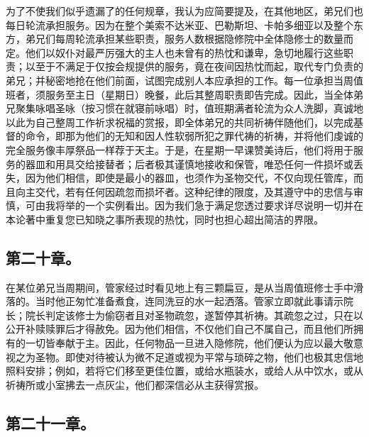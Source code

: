 为了不使我们似乎遗漏了的任何规章，我认为应简要提及，在其他地区，弟兄们也每日轮流承担服务。因为在整个美索不达米亚、巴勒斯坦、卡帕多细亚以及整个东方，弟兄们每周轮流承担某些职责，服务人数根据隐修院中全体隐修士的数量而定。他们以奴仆对最严厉强大的主人也未曾有的热忱和谦卑，急切地履行这些职责；以至于不满足于仅按会规提供的服务，竟在夜间因热忱而起，取代专门负责的弟兄；并秘密地抢在他们前面，试图完成别人本应承担的工作。每一位承担当周值班者，须服务至主日（星期日）晚餐，此后其整周职责即告完成。因此，当全体弟兄聚集咏唱圣咏（按习惯在就寝前咏唱）时，值班期满者轮流为众人洗脚，真诚地以此为自己整周工作祈求祝福的赏报，即全体弟兄的共同祈祷伴随他们，以完成基督的命令，即那为他们的无知和因人性软弱所犯之罪代祷的祈祷，并将他们虔诚的完全服务像丰厚祭品一样荐于天主。于是，在星期一早课赞美诗后，他们将用于服务的器皿和用具交给接替者；后者极其谨慎地接收和保管，唯恐任何一件损坏或丢失，因为他们相信，即使是最小的器皿，也须作为圣物交代，不仅向现任管库，而且向主交代，若有任何因疏忽而损坏者。这种纪律的限度，及其遵守中的忠信与审慎，可由我将举的一个实例看出。因为我们急于满足您透过要求详尽说明一切并在本论著中重复您已知晓之事所表现的热忱，同时也担心超出简洁的界限。\par


\subsection{第二十章。}

\par

在某位弟兄当周期间，管家经过时看见地上有三颗扁豆，是从当周值班修士手中滑落的。当时他正匆忙准备煮食，连同洗豆的水一起洒落。管家立即就此事请示院长；院长判定该修士为偷窃者且对圣物疏忽，遂暂停其祈祷。其疏忽之过，只在以公开补赎赎罪后才得赦免。因为他们相信，不仅他们自己不属自己，而且他们所拥有的一切皆奉献于主。因此，任何物品一旦进入隐修院，他们便认为应以最大敬意视之为圣物。即使对待被认为微不足道或视为平常与琐碎之物，他们也极其忠信地照料安排；例如，若将它们移至更佳位置，或给水瓶装水，或给人从中饮水，或从祈祷所或小室拂去一点灰尘，他们都深信必从主获得赏报。\par


\subsection{第二十一章。}

